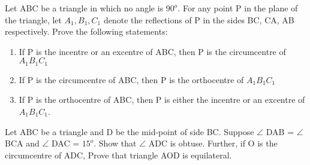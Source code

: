 \item Let ABC be a triangle in which no angle is $90^{o}$. For any point P in the plane
of the triangle, let $A_1, B_1, C_1$ denote the reflections of P in the sides BC, CA, AB
respectively. Prove the following statements:
\begin{enumerate}
\item If P is the incentre or an excentre of ABC, then P is the circumcentre of $A_1B_1C_1$
\item If P is the circumcentre of ABC, then P is the orthocentre of $A_1B_1C_1$
\item If P is the orthocentre of ABC, then P is either the incentre or an excentre of
$A_1B_1C_1$.
\end{enumerate}

\item Let ABC be a triangle and D be the mid-point of side BC. Suppose $\angle$ DAB = $\angle$ BCA and $\angle$ DAC = $15^{o}$. Show that $\angle$ ADC is obtuse. Further, if O is the circumcentre of ADC, Prove that triangle AOD is equilateral.






















